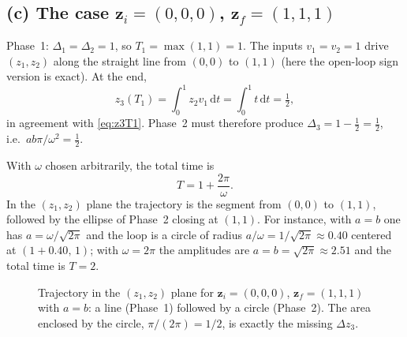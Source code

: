 \documentclass[11pt,a4paper]{article}
\theoremstyle{definition}
\theoremstyle{plain}
\theoremstyle{remark}
\newcommand{\z}{\boldsymbol{z}}
\begin{document}
\subsection{(c) The case $\z_i=(0,0,0)$, $\z_f=(1,1,1)$}

Phase~1: $\Delta_1=\Delta_2=1$, so $T_1=\max(1,1)=1$. The inputs $v_1=v_2=1$ drive $(z_1,z_2)$ along the straight line from $(0,0)$ to $(1,1)$ (here the open-loop sign version is exact). At the end,
\[
  z_3(T_1)=\int_0^1 z_2v_1\,\mathrm dt=\int_0^1 t\,\mathrm dt=\tfrac12 ,
\]
in agreement with \eqref{eq:z3T1}. Phase~2 must therefore produce $\Delta_3=1-\tfrac12=\tfrac12$, i.e.\ $ab\pi/\omega^2=\tfrac12$.

With $\omega$ chosen arbitrarily, the total time is
\[
  T=1+\frac{2\pi}{\omega}.
\]
In the $(z_1,z_2)$ plane the trajectory is the segment from $(0,0)$ to $(1,1)$, followed by the ellipse of Phase~2 closing at $(1,1)$. For instance, with $a=b$ one has $a=\omega/\sqrt{2\pi}$ and the loop is a circle of radius $a/\omega=1/\sqrt{2\pi}\approx0.40$ centered at $(1+0.40,\,1)$; with $\omega=2\pi$ the amplitudes are $a=b=\sqrt{2\pi}\approx2.51$ and the total time is $T=2$.

\begin{figure}[H]
\centering
{}
\caption{Trajectory in the $(z_1,z_2)$ plane for $\z_i=(0,0,0)$, $\z_f=(1,1,1)$ with $a=b$: a line (Phase~1) followed by a circle (Phase~2). The area enclosed by the circle, $\pi/(2\pi)=1/2$, is exactly the missing $\Delta z_3$.}
\end{figure}
\end{document}
